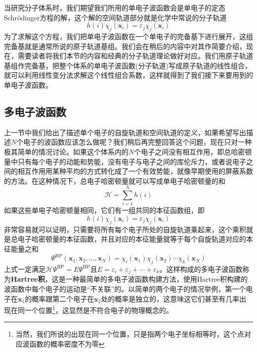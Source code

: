 \documentclass[12pt,a4paper,openany,twoside]{book}
\numberwithin{equation}{section}
\newcommand{\sch}{Schr\"odinger}
\begin{document}
          当研究分子体系时，我们期望我们所用的单电子波函数会是单电子的定态\sch 方程的解，这个解的空间轨道部分就是化学中常说的分子轨道
          \begin{equation}
            h(i) \chi_{j}\left(\mathbf{x}_{i}\right)=\varepsilon_{j} \chi_{j}\left(\mathbf{x}_{i}\right)
          \end{equation}
          为了求解这个方程，我们把单电子波函数在一个单电子的完备基下进行展开，这组完备基就是通常所说的原子轨道基组。我们会在稍后的内容中对其作简要介绍，现在，需要读者将我们本节的内容和经典的分子轨道理论做好对应。我们用原子轨道基组作完备基，把整个体系的单电子波函数(分子轨道)写成原子轨道的线性组合，就可以利用线性变分法求解这个线性组合系数，这样就得到了我们接下来要用到的单电子波函数。
        \subsection{多电子波函数}
          上一节中我们给出了描述单个电子的自旋轨道和空间轨道的定义，如果希望写出描述$N$个电子的波函数应该怎么做呢？我们稍后再完整回答这个问题，现在只对一种极其简单的情况讨论。如果这个体系内的$N$个电子之间没有相互作用，即总哈密顿量中只有每个电子的动能和势能，没有电子与电子之间的库伦斥力，或者说电子之间的相互作用用某种平均的方式转化成了一个有效势能，就像早期使用的屏蔽系数的方法。在这种情况下，总电子哈密顿量就可以写成单电子哈密顿量的和
          \begin{equation}
            \mathscr{H}=\sum_{i=1}^{N} h(i)
          \end{equation}
          如果这些单电子哈密顿量相同，它们有一组共同的本征函数组，即
          \begin{equation}
            h(i) \chi_{j}\left(\mathbf{x}_{i}\right)=\varepsilon_{j} \chi_{j}\left(\mathbf{x}_{i}\right)
          \end{equation}
          非常容易就可以证明，只需要将所有每个电子所处的自旋轨道乘起来，这个乘积就是总电子哈密顿量的本征函数，并且对应的本征能量就等于每个自旋轨道对应的本征能量之和
          \begin{equation}
            \Psi^{\mathrm{HP}}\left(\mathbf{x}_{1}, \mathbf{x}_{2}, \ldots, \mathbf{x}_{N}\right)=\chi_{i}\left(\mathbf{x}_{1}\right) \chi_{j}\left(\mathbf{x}_{2}\right) \cdots \chi_{k}\left(\mathbf{x}_{N}\right)
          \end{equation}
          上式一定满足$\mathscr{H} \Psi^{\mathrm{HP}}=E \Psi^{\mathrm{HP}}$且$E=\varepsilon_{i}+\varepsilon_{j}+\cdots+\varepsilon_{k}$。这样构成的多电子波函数称为\textbf{Hartree积}，这是一种最简单的多电子波函数构建方法，使用Hartree积构建的波函数中每个电子的运动是“不关联”的。以简单的两个电子的情况举例，第一个电子在$\mathbf{x}_{1}$的概率跟第二个电子在$\mathbf{x}_{2}$处的概率是独立的，这意味这它们甚至有几率出现在同一个位置\footnote{当然，我们所说的出现在同一个位置，只是指两个电子坐标相等时，这个点对应波函数的概率密度不为零}，这显然是不符合电子的物理概念的。
\end{document}
